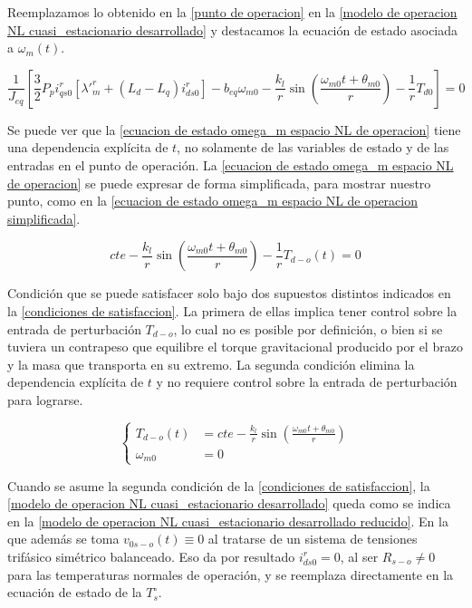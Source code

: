 \documentclass[a4paper, 10pt, onecolumn,journal]{ieeeconf}
\begin{document}
Reemplazamos lo obtenido en la \cref{punto de operacion} en la \cref{modelo de operacion NL cuasi_estacionario desarrollado}
y destacamos la ecuación de estado asociada a $\omega_m(t)$.

\begin{equation}    
    \frac{1}{J_{eq}}\left[\frac{3}{2} P_p i^r_{qs0}\left[\lambda'^r_m + (L_d - L_q) i^r_{ds0} \right] - b_{eq}\omega_{m0} - \frac{k_l}{r}\sin\left(\frac{\omega_{m0}t + \theta_{m0}}{r}\right) - \frac{1}{r}T_{d0}\right] = 0
    \label{ecuacion de estado omega_m espacio NL de operacion}
\end{equation}

Se puede ver que la \cref{ecuacion de estado omega_m espacio NL de operacion} 
tiene  una dependencia explícita de $t$, no solamente de las variables de 
estado y de las entradas en el punto de operación. La \cref{ecuacion de estado omega_m espacio NL de operacion}
se puede expresar de forma simplificada, para mostrar nuestro punto, como en la \cref{ecuacion de estado omega_m espacio NL de operacion simplificada}.

\begin{equation}    
    cte - \frac{k_l}{r}\sin\left(\frac{\omega_{m0}t + \theta_{m0}}{r}\right) - \frac{1}{r}T_{d-o}(t) = 0
    \label{ecuacion de estado omega_m espacio NL de operacion simplificada}
\end{equation}

Condición que se puede satisfacer solo bajo dos supuestos distintos indicados en la \cref{condiciones de satisfaccion}.
La primera de ellas implica tener control sobre la entrada de perturbación $T_{d-o}$, lo cual
no es posible por definición, o bien si se tuviera un contrapeso que equilibre el torque
gravitacional producido por el brazo y la masa que transporta en su extremo. La segunda condición
elimina la dependencia explícita de $t$ y no requiere control sobre la entrada de perturbación para
lograrse.

\begin{equation}
    \begin{cases}
        T_{d-o}(t) &= cte - \frac{k_l}{r}\sin\left(\frac{\omega_{m0}t + \theta_{m0}}{r}\right)\\
        \omega_{m0} &= 0
    \end{cases}
    \label{condiciones de satisfaccion}
\end{equation}

Cuando se asume la segunda condición de la \cref{condiciones de satisfaccion},
la \cref{modelo de operacion NL cuasi_estacionario desarrollado} queda como se indica en la 
\cref{modelo de operacion NL cuasi_estacionario desarrollado reducido}. En la que
además se toma $v_{0s-o}(t) \equiv 0$ al tratarse de un sistema de
tensiones trifásico simétrico balanceado. Eso da por resultado $i^r_{ds0} = 0$,
al ser $R_{s-o} \neq 0$ para las temperaturas normales de operación, y se reemplaza directamente en la 
ecuación de estado de la $T^{\circ}_{s}$.
\end{document}
